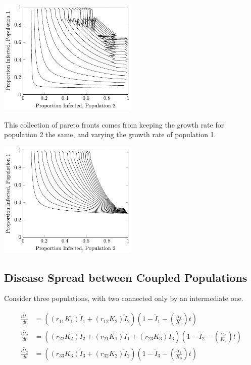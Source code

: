 \documentclass{article}
\begin{document}
\includegraphics[width=0.5\textwidth]{figures/vaccination-model-same-r-pareto-curves.pdf}

This collection of pareto fronts comes from keeping the growth
	rate for population 2 the same, and varying the growth
	rate of population 1.

\includegraphics[width=0.5\textwidth]{figures/vaccination-model-different-r-pareto-curves.pdf}

\subsection{Disease Spread between Coupled Populations}

Consider three populations, with two connected only by an intermediate
	one.


\begin{align*}
\frac{d\widetilde{I}_1}{dt} & = \left( \left( r_{11} K_1 \right) \widetilde{I}_1 
			+ \left( r_{12} K_2 \right)  \widetilde{I}_2 \right)
		\left( 1 - \widetilde{I}_1 - \left( \frac{\alpha_1}{K_1} \right) t \right)\\
\frac{d\widetilde{I}_2}{dt} & = \left( \left( r_{22} K_2 \right) \widetilde{I}_2 
			+ \left( r_{21} K_1 \right)  \widetilde{I}_1 
			+ \left( r_{23} K_3 \right) \widetilde{I}_3 \right)
		\left( 1 - \widetilde{I}_2 - \left( \frac{\alpha_2}{K_2} \right) t \right)\\
\frac{d\widetilde{I}_3}{dt} & = \left( \left( r_{33} K_3 \right) \widetilde{I}_3 
			+ \left( r_{32} K_2 \right)  \widetilde{I}_2 \right)
		\left( 1 - \widetilde{I}_3 - \left( \frac{\alpha_3}{K_3} \right) t \right)
\end{align*}
\end{document}
